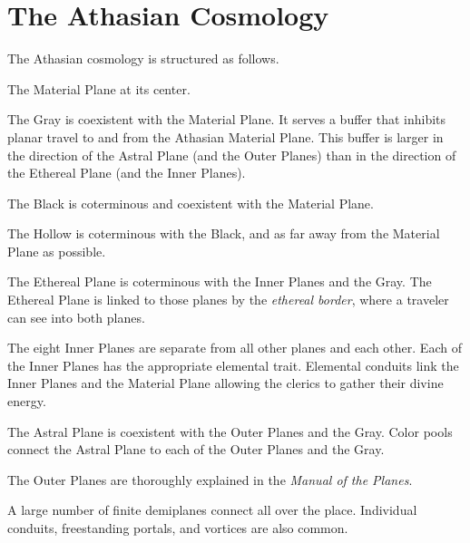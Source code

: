 \section{The Athasian Cosmology}
The Athasian cosmology is structured as follows.

The Material Plane at its center.

The Gray is coexistent with the Material Plane. It serves a buffer that inhibits planar travel to and from the Athasian Material Plane. This buffer is larger in the direction of the Astral Plane (and the Outer Planes) than in the direction of the Ethereal Plane (and the Inner Planes).

The Black is coterminous and coexistent with the Material Plane.

The Hollow is coterminous with the Black, and as far away from the Material Plane as possible.

The Ethereal Plane is coterminous with the Inner Planes and the Gray. The Ethereal Plane is linked to those planes by the \emph{ethereal border}, where a traveler can see into both planes.

The eight Inner Planes are separate from all other planes and each other. Each of the Inner Planes has the appropriate elemental trait. Elemental conduits link the Inner Planes and the Material Plane allowing the clerics to gather their divine energy.

The Astral Plane is coexistent with the Outer Planes and the Gray. Color pools connect the Astral Plane to each of the Outer Planes and the Gray.



The Outer Planes are thoroughly explained in the \emph{Manual of the Planes}.

A large number of finite demiplanes connect all over the place. Individual conduits, freestanding portals, and vortices are also common.
